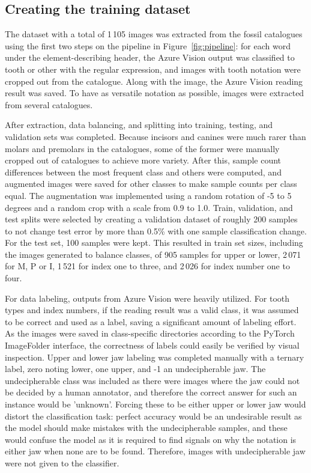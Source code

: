 \documentclass[english,twoside,openright]{UH_DS_MSc}
\begin{document}
\subsection{Creating the training dataset}

The dataset with a total of 1\,105 images was extracted from the fossil 
catalogues using the first two steps on the pipeline in Figure~\ref{fig:pipeline}:
for each word under the element-describing header, the Azure Vision output was classified 
to tooth or other with the regular expression, and 
images with tooth notation were cropped out from the catalogue. Along with the image, the 
Azure Vision \cite{azurevision} reading result was saved. To have as versatile notation as possible, images were 
extracted from several catalogues.

After extraction, data balancing, and splitting into training, testing, and validation sets 
was completed.
Because incisors and canines were much rarer 
than molars and premolars in the catalogues, some of the former were manually cropped out 
of catalogues to achieve more variety. After this, sample count differences 
 between the most frequent class and others were computed, and augmented 
images were saved for other classes to make sample counts per class equal. The augmentation 
was implemented using a random rotation of -5 to 5 degrees and a random crop with a scale from 0.9 to 1.0.
Train, validation, and test splits were selected by creating a validation dataset of roughly 200 samples to
 not change test error by more than 0.5\% with one sample classification
change. For the test set, 100 samples were kept. This resulted in 
train set sizes, including the images generated to balance classes, of 905 samples for upper or lower, 
2\,071 for M, P or I, 1\,521 for index one to three, and 2\,026 for index number one to four.

For data labeling, outputs from Azure Vision were heavily utilized. For 
tooth types and index numbers, if the reading result was a valid class, it was assumed to 
be correct and used as a label, saving a significant amount of labeling effort. As the 
images were saved in class-specific directories according to the PyTorch ImageFolder interface,
the correctness of labels could easily be verified by visual inspection. Upper and lower jaw labeling 
was completed manually with a ternary label, zero noting lower, one upper, and -1 an undecipherable jaw.
The undecipherable class was included as there were images where the jaw could not be decided by a human annotator, 
and therefore the correct answer for such an instance would be 'unknown'. Forcing these to be either upper or lower jaw 
would distort the classification task: perfect accuracy would be an undesirable result as the model should 
make mistakes with the undecipherable samples, and these would confuse the model as it is required to find signals on why 
the notation is either jaw when none are to be found. Therefore, images with undecipherable jaw were not given 
to the classifier.
\end{document}
